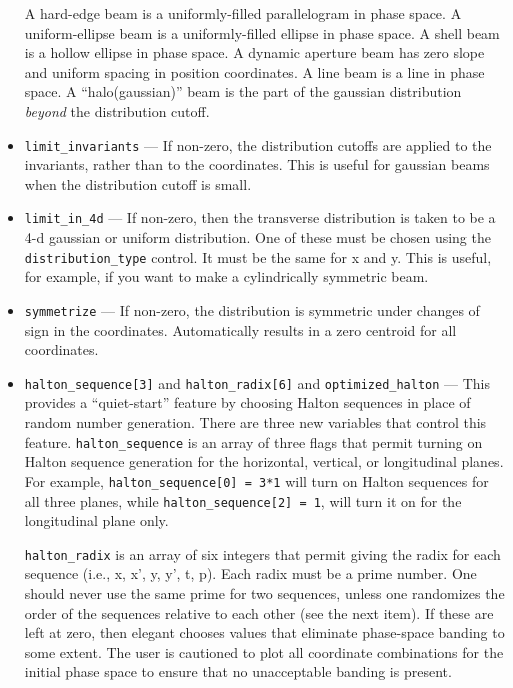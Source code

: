 \documentclass[11pt]{article}
\begin{document}
\begin{itemize}
A hard-edge beam is a uniformly-filled parallelogram in phase space.
A uniform-ellipse beam is a uniformly-filled ellipse in phase space.
A shell beam is a hollow ellipse in phase space.  A dynamic aperture
beam has zero slope and uniform spacing in position coordinates.  A
line beam is a line in phase space.  A ``halo(gaussian)'' beam is
the part of the gaussian distribution {\em beyond} the distribution cutoff.

\item \verb|limit_invariants| --- If non-zero, the distribution
cutoffs are applied to the invariants, rather than to the coordinates.
This is useful for gaussian beams when the distribution cutoff is
small.

\item \verb|limit_in_4d| --- If non-zero, then the transverse
distribution is taken to be a 4-d gaussian or uniform distribution.
One of these must be chosen using the \verb|distribution_type|
control.  It must be the same for x and y.  This is useful, for
example, if you want to make a cylindrically symmetric beam.

\item \verb|symmetrize| --- If non-zero, the distribution is symmetric
under changes of sign in the coordinates.  Automatically results in a
zero centroid for all coordinates.

\item \verb|halton_sequence[3]| and \verb|halton_radix[6]| and \verb|optimized_halton|
--- This provides a ``quiet-start'' feature by choosing Halton sequences in
place of random number generation.  There are three new variables that
control this feature.  \verb|halton_sequence| is an array of three
flags that permit turning on Halton sequence generation for the
horizontal, vertical, or longitudinal planes.  For example,
\verb|halton_sequence[0] = 3*1| will turn on Halton sequences for all
three planes, while \verb|halton_sequence[2] = 1|, will turn it on for
the longitudinal plane only.

\verb|halton_radix| is an array of six integers that permit giving the
radix for each sequence (i.e., x, x', y, y', t, p).  Each radix must
be a prime number.  One should never use the same prime for two
sequences, unless one randomizes the order of the sequences relative to
each other (see the next item).  If these are left at zero, then
elegant chooses values that eliminate phase-space banding to some
extent.  The user is cautioned to plot all coordinate combinations for
the initial phase space to ensure that no unacceptable banding is
present.


\end{itemize}
\end{document}

